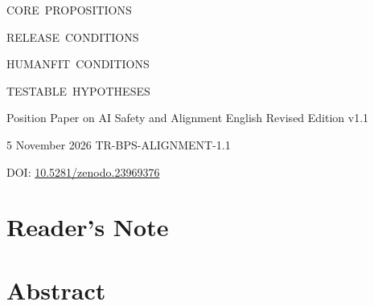 \documentclass[10pt,a4paper]{article}
\begin{document}
\begin{titlepage}
\vspace{8mm}
\begin{minipage}[t]{0.23\textwidth}
\par
{\fontsize{7.2}{9}\selectfont\color{ReportMuted}CORE\ PROPOSITIONS}
\end{minipage}\hfill
\begin{minipage}[t]{0.23\textwidth}
\par
{\fontsize{7.2}{9}\selectfont\color{ReportMuted}RELEASE\ CONDITIONS}
\end{minipage}\hfill
\begin{minipage}[t]{0.23\textwidth}
\par
{\fontsize{7.2}{9}\selectfont\color{ReportMuted}HUMANFIT\ CONDITIONS}
\end{minipage}\hfill
\begin{minipage}[t]{0.23\textwidth}
\par
{\fontsize{7.2}{9}\selectfont\color{ReportMuted}TESTABLE\ HYPOTHESES}
\end{minipage}

\vspace{10mm}
{\fontsize{8}{10}\selectfont\color{ReportMuted}
Position Paper on AI Safety and Alignment \textbullet{} English Revised Edition v1.1\par}
{\fontsize{7.5}{10}\selectfont\color{ReportMuted}
5 November 2026 \textbullet{} TR-BPS-ALIGNMENT-1.1\par
DOI: \href{https://doi.org/10.5281/zenodo.23969376}{10.5281/zenodo.23969376}\par}
\end{titlepage}

\hypersetup{pageanchor=true}
\pagestyle{gachireport}

\section{Reader's Note}


\section{Abstract}
\begin{reportabstract}
\fontsize{9.1}{11.2}\selectfont
\setlength{\parskip}{0.34em}

\end{reportabstract}

\clearpage
\tableofcontents

\clearpage
{}

\end{document}
